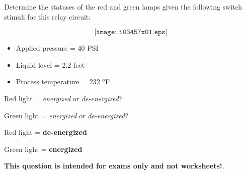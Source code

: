 

Determine the statuses of the red and green lamps given the following switch stimuli for this relay circuit:

$$\texttt{[image: i03457x01.eps]}$$

\begin{itemize}
\item{} Applied pressure = 40 PSI
\item{} Liquid level = 2.2 feet
\item{} Process temperature = 232 $^{o}$F
\end{itemize}

\vskip 10pt

Red light = {\it energized} or {\it de-energized}?

\vskip 10pt

Green light = {\it energized} or {\it de-energized}?







Red light = {\bf de-energized}

Green light = {\bf energized}







{\bf This question is intended for exams only and not worksheets!}.


